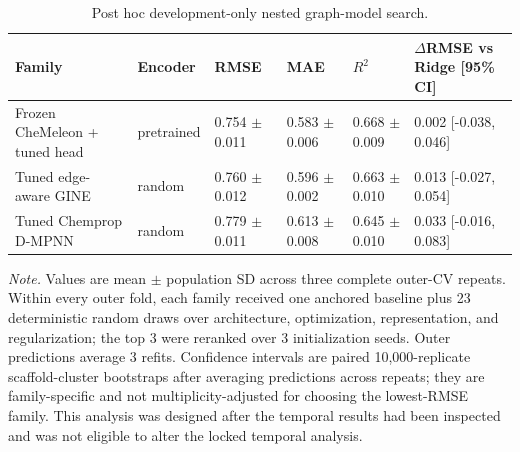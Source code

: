 \begin{table}[H]
\centering
\caption{Post hoc development-only nested graph-model search.}
\label{tab:tuned-gnn}
\scriptsize
\setlength{\tabcolsep}{2.5pt}
\begin{tabular}{L{0.24\textwidth}L{0.10\textwidth}R{0.13\textwidth}R{0.13\textwidth}R{0.13\textwidth}R{0.20\textwidth}}
\toprule
\textbf{Family} & \textbf{Encoder} & \textbf{RMSE} & \textbf{MAE} & \textbf{$R^2$} & \textbf{$\Delta$RMSE vs Ridge [95\% CI]} \\ 
\midrule
Frozen CheMeleon + tuned head & pretrained & 0.754 $\pm$ 0.011 & 0.583 $\pm$ 0.006 & 0.668 $\pm$ 0.009 & 0.002 [-0.038, 0.046] \\
Tuned edge-aware GINE & random & 0.760 $\pm$ 0.012 & 0.596 $\pm$ 0.002 & 0.663 $\pm$ 0.010 & 0.013 [-0.027, 0.054] \\
Tuned Chemprop D-MPNN & random & 0.779 $\pm$ 0.011 & 0.613 $\pm$ 0.008 & 0.645 $\pm$ 0.010 & 0.033 [-0.016, 0.083] \\
\bottomrule
\end{tabular}
\par\vspace{3pt}\parbox{0.97\textwidth}{\footnotesize \textit{Note.} Values are mean $\pm$ population SD across three complete outer-CV repeats. Within every outer fold, each family received one anchored baseline plus 23 deterministic random draws over architecture, optimization, representation, and regularization; the top 3 were reranked over 3 initialization seeds. Outer predictions average 3 refits. Confidence intervals are paired 10,000-replicate scaffold-cluster bootstraps after averaging predictions across repeats; they are family-specific and not multiplicity-adjusted for choosing the lowest-RMSE family. This analysis was designed after the temporal results had been inspected and was not eligible to alter the locked temporal analysis.}
\end{table}

